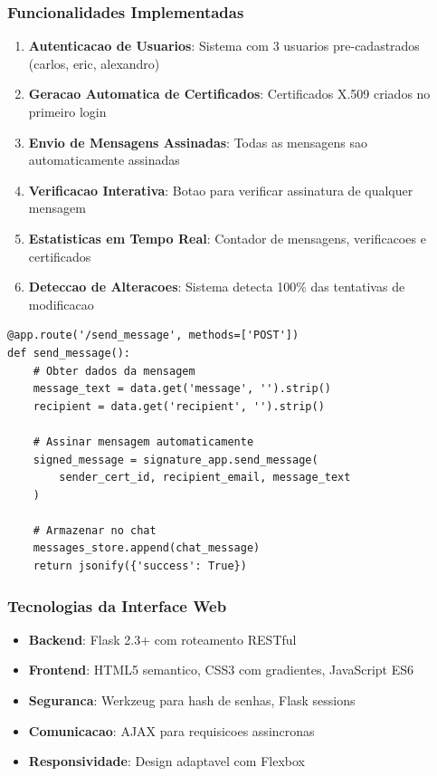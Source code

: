 \documentclass[12pt,a4paper,oneside]{article}
\begin{document}
\subsubsection{Funcionalidades Implementadas}

\begin{enumerate}
    \item \textbf{Autenticacao de Usuarios}: Sistema com 3 usuarios pre-cadastrados (carlos, eric, alexandro)
    \item \textbf{Geracao Automatica de Certificados}: Certificados X.509 criados no primeiro login
    \item \textbf{Envio de Mensagens Assinadas}: Todas as mensagens sao automaticamente assinadas
    \item \textbf{Verificacao Interativa}: Botao para verificar assinatura de qualquer mensagem
    \item \textbf{Estatisticas em Tempo Real}: Contador de mensagens, verificacoes e certificados
    \item \textbf{Deteccao de Alteracoes}: Sistema detecta 100\% das tentativas de modificacao
\end{enumerate}

\begin{lstlisting}[caption=Estrutura da aplicacao Flask]
@app.route('/send_message', methods=['POST'])
def send_message():
    # Obter dados da mensagem
    message_text = data.get('message', '').strip()
    recipient = data.get('recipient', '').strip()
    
    # Assinar mensagem automaticamente
    signed_message = signature_app.send_message(
        sender_cert_id, recipient_email, message_text
    )
    
    # Armazenar no chat
    messages_store.append(chat_message)
    return jsonify({'success': True})
\end{lstlisting}

\subsubsection{Tecnologias da Interface Web}

\begin{itemize}
    \item \textbf{Backend}: Flask 2.3+ com roteamento RESTful
    \item \textbf{Frontend}: HTML5 semantico, CSS3 com gradientes, JavaScript ES6
    \item \textbf{Seguranca}: Werkzeug para hash de senhas, Flask sessions
    \item \textbf{Comunicacao}: AJAX para requisicoes assincronas
    \item \textbf{Responsividade}: Design adaptavel com Flexbox
\end{itemize}
\end{document}

